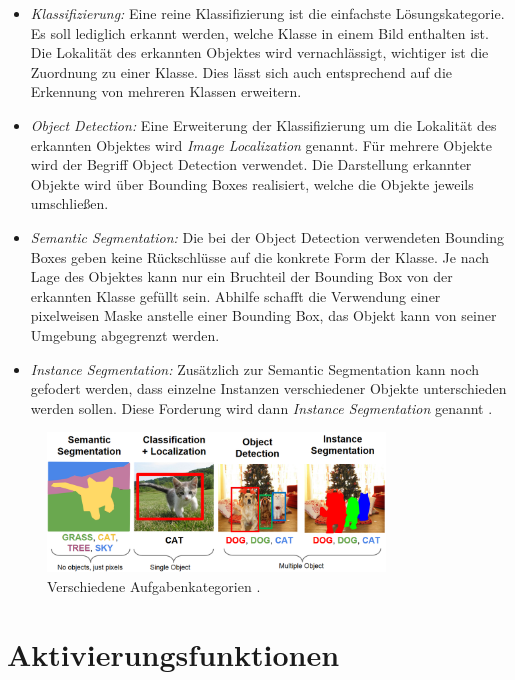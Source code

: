 \begin{itemize}
	\item \textit{Klassifizierung:}
	Eine reine Klassifizierung ist die einfachste Lösungskategorie. 
	Es soll lediglich erkannt werden, welche Klasse in einem Bild enthalten ist.
	Die Lokalität des erkannten Objektes wird vernachlässigt, wichtiger ist die Zuordnung zu einer Klasse.
	Dies lässt sich auch entsprechend auf die Erkennung von mehreren Klassen erweitern.
	
	\item \textit{Object Detection:}
	Eine Erweiterung der Klassifizierung um die Lokalität des erkannten Objektes wird \textit{Image Localization} genannt.
	Für mehrere Objekte wird der Begriff Object Detection verwendet.
	Die Darstellung erkannter Objekte wird über Bounding Boxes realisiert, welche die Objekte jeweils umschließen.

	\item \textit{Semantic Segmentation:}
	Die bei der Object Detection verwendeten Bounding Boxes geben keine Rückschlüsse auf die konkrete Form der Klasse.
	Je nach Lage des Objektes kann nur ein Bruchteil der Bounding Box von der erkannten Klasse gefüllt sein.
	Abhilfe schafft die Verwendung einer pixelweisen Maske anstelle einer Bounding Box, das Objekt kann von seiner Umgebung abgegrenzt werden.

	\item \textit{Instance Segmentation:}
	Zusätzlich zur Semantic Segmentation kann noch gefodert werden, dass einzelne Instanzen verschiedener Objekte 
	unterschieden werden sollen.
	Diese Forderung wird dann \textit{Instance Segmentation} genannt \cite{Sharma.21.08.2019}.
\end{itemize}

\begin{figure}
	\centering
	\includegraphics[width=0.8\textwidth]{Bilder/categories.png} 
	\caption{Verschiedene Aufgabenkategorien \cite{.10.11.2022}.}
	\label{fig:categories}
\end{figure} 

\section{Aktivierungsfunktionen} \label{sec:activation}

